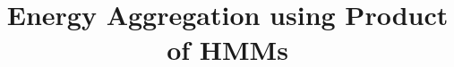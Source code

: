 \documentclass{sig-alternate}
\begin{document}
%

\title{Energy Aggregation using Product of HMMs}
%
%
%
%
%
\end{document}
